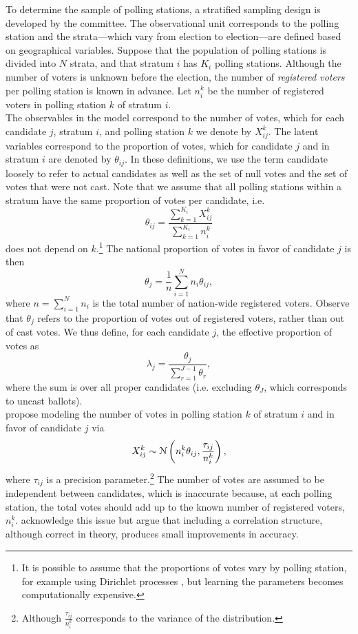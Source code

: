 \documentclass{article}
\begin{document}
To determine the sample of polling stations, a stratified sampling design is developed by the committee. The observational unit corresponds to the polling station and the strata---which vary from election to election---are defined based on geographical variables. Suppose that the population of polling stations is divided into $N$ strata, and that stratum $i$ has $K_i$ polling stations. Although the number of voters is unknown before the election, the number of \textit{registered voters} per polling station is known in advance. Let $n_i^k$ be the number of registered voters in polling station $k$ of stratum $i$. \\

The observables in the model correspond to the number of votes, which for each candidate $j$, stratum $i$, and polling station $k$ we denote by $X_{ij}^k$. The latent variables correspond to the proportion of votes, which for candidate $j$ and in stratum $i$ are denoted by $\theta_{ij}$. In these definitions, we use the term candidate loosely to refer to actual candidates as well as the set of null votes and the set of votes that were not cast. Note that we assume that all polling stations within a stratum have the same proportion of votes per candidate, i.e.
\[
\theta_{ij} = \frac{\sum_{k=1}^{K_i} X_{ij}^k}{\sum_{k=1}^{K_i} n_{i}^k}
\]
does not depend on $k$.\footnote{It is possible to assume that the proportions of votes vary by polling station, for example using Dirichlet processes \citep[see][]{lo1984class, nieto2018}, but learning the parameters becomes computationally expensive.} The national proportion of votes in favor of candidate $j$ is then
\[
  \theta_j = \frac{1}{n} \sum_{i=1}^N n_i \theta_{ij}, \label{eq:thetaj}
\]
where $n = \sum_{i=1}^N n_i$ is the total number of nation-wide registered voters. Observe that $\theta_j$ refers to the proportion of votes out of registered voters, rather than out of cast votes. We thus define, for each candidate $j$, the effective proportion of votes as
\[
  \lambda_j = \frac{\theta_j}{\sum_{r = 1}^{J-1} \theta_r},  \label{eq:lambdaj}
\]
where the sum is over all proper candidates (i.e. excluding $\theta_J$, which corresponds to uncast ballots). \\



\citet{mendoza-nieto2016} propose modeling the number of votes in polling station $k$ of stratum $i$ and in favor of candidate $j$ via
\[
  X_{ij}^k \sim \mathcal{N} \left( n_i^k \theta_{ij}, \frac{\tau_{ij}}{n_i^k} \right), \label{eq:original_likelihood}
\]
where $\tau_{ij}$ is a precision parameter.\footnote{Although $\frac{\tau_{ij}}{n_i^k}$ corresponds to the variance of the distribution.} The number of votes are assumed to be independent between candidates, which is inaccurate because, at each polling station, the total votes should add up to the known number of registered voters, $n_i^k$. \citet{mendoza-nieto2016} acknowledge this issue but argue that including a correlation structure, although correct in theory, produces small improvements in accuracy. \\
\end{document}
